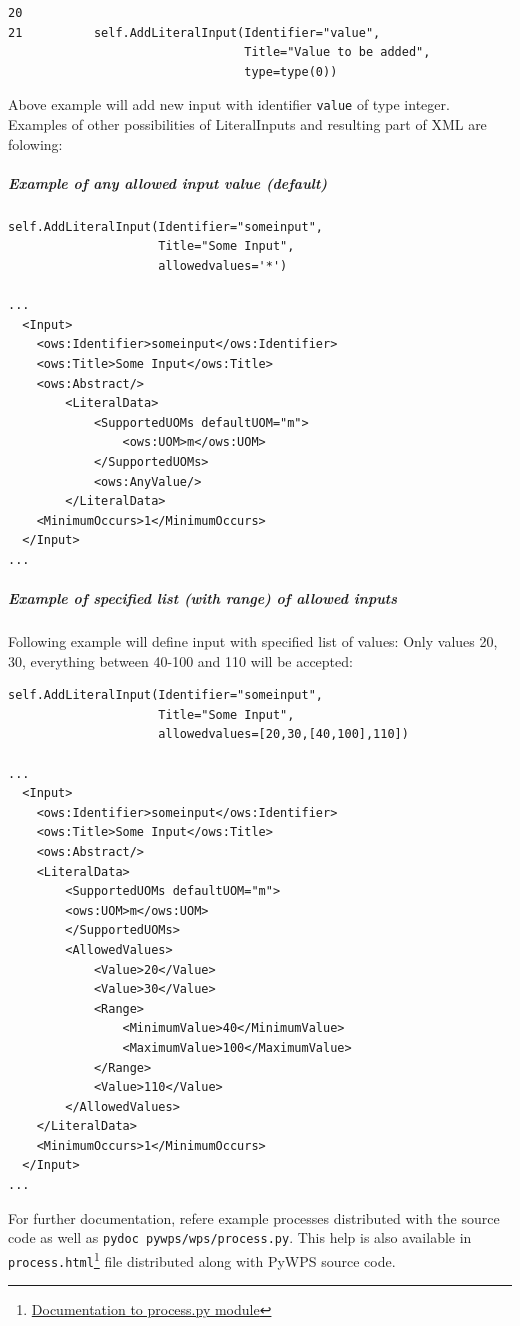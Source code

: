 \documentclass[a4paper,11pt]{article}
\begin{document}
\begin{verbatim}
20
21          self.AddLiteralInput(Identifier="value",
                                 Title="Value to be added",
                                 type=type(0))
\end{verbatim}

Above example will add new input with identifier \texttt{value} of type
integer. Examples of other possibilities of LiteralInputs and resulting
part of XML are folowing:

\subparagraph{Example of any allowed input value (default)}
\begin{verbatim}
self.AddLiteralInput(Identifier="someinput", 
                     Title="Some Input", 
                     allowedvalues='*')

...
  <Input>
    <ows:Identifier>someinput</ows:Identifier>
    <ows:Title>Some Input</ows:Title>
    <ows:Abstract/>
        <LiteralData>
            <SupportedUOMs defaultUOM="m">
                <ows:UOM>m</ows:UOM>
            </SupportedUOMs>
            <ows:AnyValue/>
        </LiteralData>
    <MinimumOccurs>1</MinimumOccurs>
  </Input>
...
\end{verbatim}

\subparagraph{Example of specified list (with range) of allowed inputs}

Following example will define input with specified list of values: Only
values 20, 30, everything between 40-100 and 110 will be accepted:
\begin{verbatim}
self.AddLiteralInput(Identifier="someinput",
                     Title="Some Input",
                     allowedvalues=[20,30,[40,100],110])

...
  <Input>
    <ows:Identifier>someinput</ows:Identifier>
    <ows:Title>Some Input</ows:Title>
    <ows:Abstract/>
    <LiteralData>
    	<SupportedUOMs defaultUOM="m">
        <ows:UOM>m</ows:UOM>
        </SupportedUOMs>
        <AllowedValues>
            <Value>20</Value>
            <Value>30</Value>
            <Range>
                <MinimumValue>40</MinimumValue>
                <MaximumValue>100</MaximumValue>
            </Range>
            <Value>110</Value>
        </AllowedValues>
    </LiteralData>
    <MinimumOccurs>1</MinimumOccurs>
  </Input>
...
\end{verbatim}

For further documentation, refere example processes distributed with the
source code as well as \texttt{pydoc~pywps/wps/process.py}. This help is
also available in
\texttt{process.html}\footnote{\href{http://wald.intevation.org/plugins/scmsvn/viewcvs.php/*checkout*/trunk/doc/process.html?rev=369&root=pywps}{Documentation
to process.py module}} file distributed along with PyWPS
source code.
\end{document}
